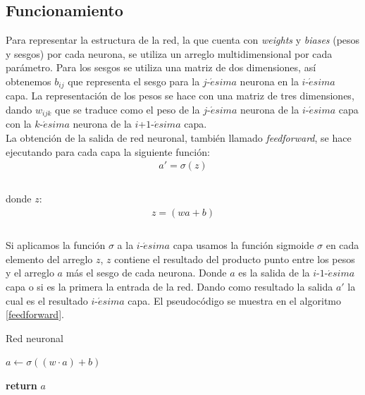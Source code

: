 \documentclass{iccmemoria}
\begin{document}
\subsection{Funcionamiento}
 
Para representar la estructura de la red, la que cuenta con \emph{weights} y \emph{biases} (pesos y sesgos) por cada neurona, se utiliza un arreglo multidimensional por cada parámetro. Para los sesgos se utiliza una matriz de dos dimensiones, así obtenemos $b_{ij}$ que representa el sesgo para la $j$-$\acute{e}sima$ neurona en la $i$-$\acute{e}sima$ capa. La representación de los pesos se hace con una matriz de tres dimensiones, dando $w_{ijk}$ que se traduce como el peso de la $j$-$\acute{e}sima$ neurona de la $i$-$\acute{e}sima$ capa con la $k$-$\acute{e}sima$ neurona de la $i$+$1$-$\acute{e}sima$ capa.\\
 
La obtención de la salida de red neuronal, también llamado \emph{feedforward}, se hace ejecutando para cada capa la siguiente función:\\

\begin{equation}
	\begin{split}
	a' = \sigma{(z)}\\
	\end{split}
\end{equation}\\

donde $z$:\\

\begin{equation}
	\begin{split}
	z = (wa + b)\\
	\end{split}
\end{equation}\\

Si aplicamos la función $\sigma$ a la $i$-$\acute{e}sima$ capa usamos la función sigmoide $\sigma$ en cada elemento del arreglo $z$, $z$ contiene el resultado del producto punto entre los pesos y el arreglo $a$ más el sesgo de cada neurona. Donde $a$ es la salida de la $i$-$1$-$\acute{e}sima$ capa o si es la primera la entrada de la red. Dando como resultado la salida $a'$ la cual es el resultado $i$-$\acute{e}sima$ capa. El pseudocódigo se muestra en el algoritmo \ref{feedforward}.\\

\begin{algorithm}[H]
\caption{Red neuronal}\label{feedforward}
\begin{algorithmic}[1]

	\State $a \gets \sigma((w \cdot a)+b)$
\EndFor

\State \textbf{return} $a$
\EndFunction
\end{algorithmic}
\end{algorithm}
\end{document}
